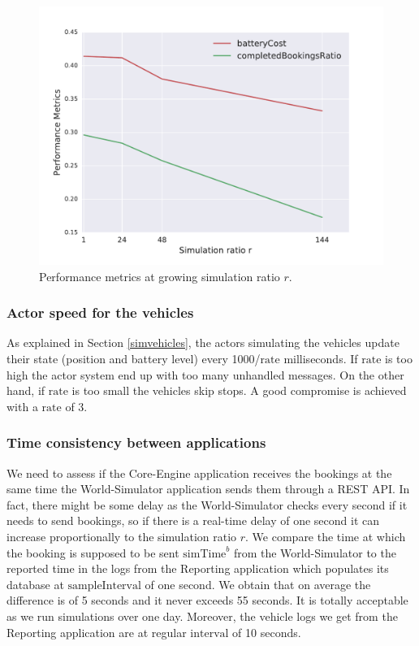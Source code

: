 \documentclass[12pt,a4paper]{article}
\begin{document}
\begin{figure} 
  \centering
  \vspace{-0.5em}
\includegraphics[scale=0.7]{./images/stability.pdf}
\caption{Performance metrics at growing simulation ratio $r$.}
\label{fig:stability}
\end{figure}

\subsubsection{Actor speed for the vehicles} As explained in Section \ref{simvehicles}, the actors simulating the vehicles update their state (position and battery level) every 1000/$\text{rate}$ milliseconds. If $\text{rate}$ is too high the actor system end up with too many unhandled messages. On the other hand, if $\text{rate}$ is too small the vehicles skip stops. A good compromise is achieved with a $\text{rate}$ of 3.

\subsubsection{Time consistency between applications} We need to assess if the Core-Engine application receives the bookings at the same time the World-Simulator application sends them through a REST API. In fact, there might be some delay as the World-Simulator checks every second if it needs to send bookings, so if there is a real-time delay of one second it can increase proportionally to the simulation ratio $r$. We compare the time at which the booking is supposed to be sent $\text{simTime}^{b}$ from the World-Simulator to the reported time in the logs from the Reporting application which populates its database at $\text{sampleInterval}$ of one second. We obtain that on average the difference is of 5 seconds and it never exceeds 55 seconds. It is totally acceptable as we run simulations over one day. Moreover, the vehicle logs we get from the Reporting application are at regular $\text{interval}$ of 10 seconds.
\end{document}
